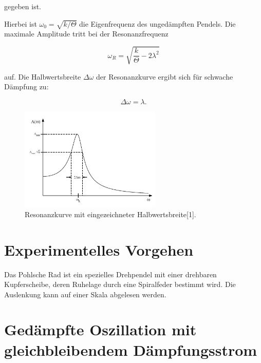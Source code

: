 \documentclass{article}
\begin{document}
gegeben ist.

Hierbei ist $\omega_0 = \sqrt{k/\Theta}$ die Eigenfrequenz des ungedämpften Pendels. Die maximale Amplitude tritt bei der Resonanzfrequenz

\begin{equation}
    \omega_R = \sqrt{\frac{k}{\Theta} - 2\lambda^2}
    \label{Gleichung8}
\end{equation}

auf. Die Halbwertsbreite $\Delta\omega$ der Resonanzkurve ergibt sich für schwache Dämpfung zu:

\begin{equation}
    \Delta\omega = \lambda.
    \label{9}
\end{equation}


\begin{figure}[H]
    \centering
    \includegraphics[width=0.6\textwidth]{Resonanzkurve.jpg}
    \caption{Resonanzkurve mit eingezeichneter Halbwertsbreite[1].}
    \label{fig:Resonanzkurve}
\end{figure}




\vspace{1cm}  
\section{Experimentelles Vorgehen}
Das Pohlsche Rad ist ein spezielles Drehpendel mit einer drehbaren Kupferscheibe, deren Ruhelage durch eine Spiralfeder bestimmt wird. Die Auslenkung kann auf einer Skala abgelesen werden.



\section{Gedämpfte Oszillation mit gleichbleibendem Dämpfungsstrom}
\end{document}
